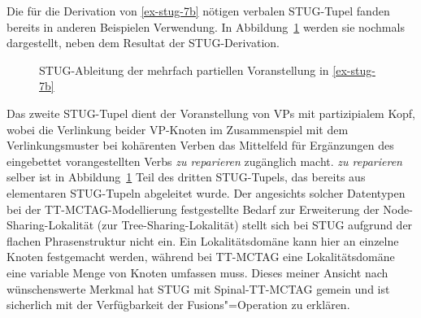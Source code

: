 Die für die Derivation von \ref{ex-stug-7b} nötigen verbalen STUG-Tupel fanden bereits in anderen Beispielen Verwendung. In Abbildung~\ref{fig-stug-13} werden sie nochmals dargestellt, neben dem Resultat der STUG-Derivation.   
\begin{figure}[t]
\centering
{}
\caption{\label{fig-stug-13} STUG-Ableitung der mehrfach partiellen Voranstellung in \ref{ex-stug-7b}}
\end{figure}
Das zweite STUG-Tupel dient der Voranstellung von VPs mit partizipialem Kopf, wobei die Verlinkung beider VP-Knoten im Zusammenspiel mit dem Verlinkungsmuster bei kohärenten Verben das Mittelfeld für Ergänzungen des eingebettet vorangestellten Verbs {\it zu reparieren} zugänglich macht. {\it zu reparieren} selber ist in Abbildung~\ref{fig-stug-13} Teil des dritten STUG-Tupels, das bereits aus elementaren STUG-Tupeln abgeleitet wurde. Der angesichts solcher Datentypen bei der TT-MCTAG-Modellierung festgestellte Bedarf zur Erweiterung der Node-Sharing-Lokalität (zur Tree-Sharing-Lokalität) stellt sich bei STUG aufgrund der flachen Phrasenstruktur nicht ein. Ein Lokalitätsdomäne kann hier an einzelne Knoten festgemacht werden, während bei TT-MCTAG eine Lokalitätsdomäne eine variable Menge von Knoten umfassen muss. Dieses meiner Ansicht nach wünschenswerte Merkmal hat STUG mit Spinal-TT-MCTAG gemein und ist sicherlich mit der Verfügbarkeit der Fusions"=Operation zu erklären.\\ 

